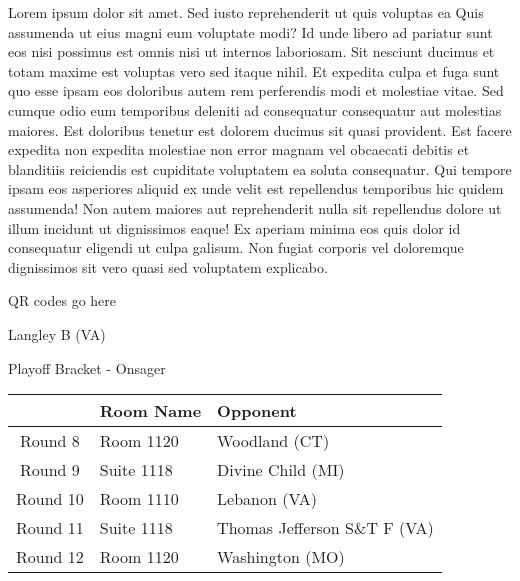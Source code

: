 \documentclass{article}%
\begin{document}
\vspace*{8pt}%
\linebreak%
\newline%
\newline%
Lorem ipsum dolor sit amet. Sed iusto reprehenderit ut quis voluptas ea Quis assumenda ut eius magni eum voluptate modi? Id unde libero ad pariatur sunt eos nisi possimus est omnis nisi ut internos laboriosam. Sit nesciunt ducimus et totam maxime est voluptas vero sed itaque nihil. Et expedita culpa et fuga sunt quo esse ipsam eos doloribus autem rem perferendis modi et molestiae vitae.\newline%
\newline%
Sed cumque odio eum temporibus deleniti ad consequatur consequatur aut molestias maiores. Est doloribus tenetur est dolorem ducimus sit quasi provident. Est facere expedita non expedita molestiae non error magnam vel obcaecati debitis et blanditiis reiciendis est cupiditate voluptatem ea soluta consequatur. Qui tempore ipsam eos asperiores aliquid ex unde velit est repellendus temporibus hic quidem assumenda!\newline%
\newline%
Non autem maiores aut reprehenderit nulla sit repellendus dolore ut illum incidunt ut dignissimos eaque! Ex aperiam minima eos quis dolor id consequatur eligendi ut culpa galisum. Non fugiat corporis vel doloremque dignissimos sit vero quasi sed voluptatem explicabo.\newline%
\newline%
%
\vspace*{30pt}%
\begin{center}%
\begin{Huge}%
QR codes go here%
\end{Huge}%
\end{center}%
\newpage%
\begin{center}%
\begin{Huge}%
Langley B (VA)%
\end{Huge}%
\vspace*{8pt}%
\linebreak%
\begin{Large}%
Playoff Bracket {-} Onsager%
\end{Large}%
\end{center}%
%
\begin{tabularx}{\textwidth}{|c|Y|Y|}%
\hline%
&Room Name&Opponent\\%
\hline%
Round 8&Room 1120&Woodland (CT)\\%
Round 9&Suite 1118&Divine Child (MI)\\%
Round 10&Room 1110&Lebanon (VA)\\%
Round 11&Suite 1118&Thomas Jefferson S\&T F (VA)\\%
Round 12&Room 1120&Washington (MO)\\%
\hline%
\end{tabularx}%
\end{document}
